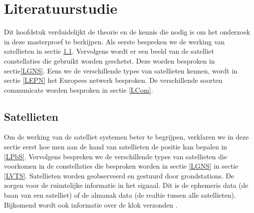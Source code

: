 \chapter{Literatuurstudie}
Dit hoofdstuk verduidelijkt de theorie en de kennis die nodig is om het onderzoek in deze masterproef te berkijpen. Als eerste bespreken we de werking van satellieten in sectie \ref{LSat}. Vervolgens wordt er een beeld van de satelliet constellaties die gebruikt worden geschetst. Deze worden besproken in sectie\ref{LGNS}. Eens we de verschillende types van satellieten kennen, wordt in sectie \ref{LEPN} het Europees netwerk besproken. De verschillende soorten communicate worden besproken in sectie \ref{LCom}.

\section{Satellieten}
\label{LSat}
Om de werking van de satelliet systemen beter te begrijpen, verklaren we in deze sectie eerst hoe men aan de hand van satellieten de positie kan bepalen in \ref{LPbS}. Vervolgens bespreken we de verschillende types van satellieten  die voorkomen in de constellaties die besproken worden in sectie \ref{LGNS} in sectie \ref{LVTS}. Satellieten worden geobserveerd en gestuurd door grondstations. De zorgen voor de ruimtelijke informatie in het signaal. Dit is de ephemeris data (de baan van een satelliet) of de almanak data (de realtie tussen alle satellieten). Bijkomend wordt ook informatie over de klok verzonden \cite{LBibGNSS8}.


